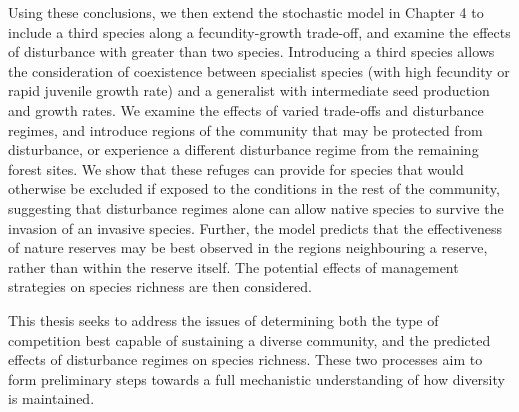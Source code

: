 Using these conclusions, we then extend the stochastic model in Chapter 4 to include a third species along a fecundity-growth trade-off, and examine the effects of disturbance with greater than two species. Introducing a third species allows the consideration of coexistence between specialist species (with high fecundity or rapid juvenile growth rate) and a generalist with intermediate seed production and growth rates. We examine the effects of varied trade-offs and disturbance regimes, and introduce regions of the community that may be protected from disturbance, or experience a different disturbance regime from the remaining forest sites. We show that these refuges can provide for species that would otherwise be excluded if exposed to the conditions in the rest of the community, suggesting that disturbance regimes alone can allow native species to survive the invasion of an invasive species. Further, the model predicts that the effectiveness of nature reserves may be best observed in the regions neighbouring a reserve, rather than within the reserve itself. The potential effects of management strategies on species richness are then considered.

This thesis seeks to address the issues of determining both the type of competition best capable of sustaining a diverse community, and the predicted effects of disturbance regimes on species richness. These two processes aim to form preliminary steps towards a full mechanistic understanding of how diversity is maintained.

